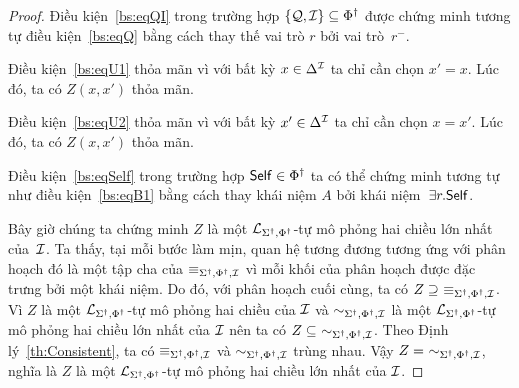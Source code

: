 \begin{proof}
	\semiItem{}Điều kiện~\eqref{bs:eqQI} trong trường hợp $\{\mathcal{Q}, \mathcal{I}\} \subseteq \Phi^\dag$ được chứng minh tương tự điều kiện~\eqref{bs:eqQ} bằng cách thay thế vai trò $r$ bởi vai trò~$r^-$.
	
	\semiItem{}Điều kiện~\eqref{bs:eqU1} thỏa mãn vì với bất kỳ $x\in\Delta^{\mathcal{I}}$ ta chỉ cần chọn $x' = x$. Lúc đó, ta có $Z(x, x')$ thỏa mãn.
	
	\semiItem{}Điều kiện~\eqref{bs:eqU2} thỏa mãn vì với bất kỳ $x'\in\Delta^{\mathcal{I}}$ ta chỉ cần chọn $x = x'$. Lúc đó, ta có $Z(x, x')$ thỏa mãn.
	
	\semiItem{}Điều kiện~\eqref{bs:eqSelf} trong trường hợp $\mathsf{Self} \in \Phi^\dag$ ta có thể chứng minh tương tự như điều kiện~\eqref{bs:eqB1} bằng cách thay khái niệm $A$ bởi khái niệm~$\exists r.\mathsf{Self}$.
	
	Bây giờ chúng ta chứng minh $Z$ là một $\mathcal{L}_{\Sigma^\dag,\Phi^\dag}$-tự mô phỏng hai chiều lớn nhất của~$\mathcal{I}$.
%
	Ta thấy, tại mỗi bước làm mịn, quan hệ tương đương tương ứng với phân hoạch đó là một tập cha của $\equiv_{\Sigma^\dag,\Phi^\dag,\mathcal{I}}$ vì mỗi khối của phân hoạch được đặc trưng bởi một khái niệm. Do đó, với phân hoạch cuối cùng, ta có $Z \supseteq\ \equiv_\SdPdI$.
	Vì $Z$ là một $\mathcal{L}_{\Sigma^\dag,\Phi^\dag}$-tự mô phỏng hai chiều của $\mathcal{I}$ và $\sim_{\Sigma^\dag,\Phi^\dag,\mathcal{I}}$ là một $\mathcal{L}_{\Sigma^\dag,\Phi^\dag}$-tự mô phỏng hai chiều lớn nhất của $\mathcal{I}$ nên ta có $Z \subseteq\ \sim_{\Sigma^\dag,\Phi^\dag,\mathcal{I}}$. Theo Định lý~\ref{th:Consistent}, ta có $\equiv_{\Sigma^\dag,\Phi^\dag,\mathcal{I}}$ và $\sim_{\Sigma^\dag,\Phi^\dag,\mathcal{I}}$ trùng nhau. Vậy $Z =\ \sim_{\Sigma^\dag,\Phi^\dag,\mathcal{I}}$, nghĩa là $Z$ là một $\mathcal{L}_{\Sigma^\dag,\Phi^\dag}$-tự mô phỏng hai chiều lớn nhất của $\mathcal{I}$.
\end{proof}

